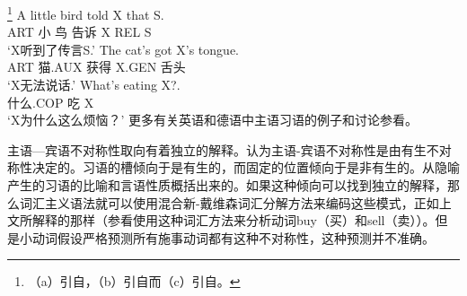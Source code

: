 \footnote{
（a）引自，（b）引自而（c）引自。
}
\eal
\ex\label{bird}
\gll A little bird told X that S.\\
     ART 小 鸟 告诉 X REL S\\
\glt `X听到了传言S.'
\ex\label{cat-tounge}
\gll The cat's got X's tongue.\\
     ART 猫.AUX 获得 X.GEN 舌头\\
\glt `X无法说话.'   
\ex\label{what-is-eating-x}
\gll What's eating X?.\\
     什么.COP 吃 X\\
\glt `X为什么这么烦恼？'
\zl
更多有关英语和德语中主语习语的例子和讨论参看。

主语—宾语不对称性取向有着独立的解释。\citet*{NSW94a}认为主语-宾语不对称性是由有生不对称性决定的。习语的槽倾向于是有生的，而固定的位置倾向于是非有生的。\citet{NSW94a}从隐喻产生的习语的比喻和言语性质概括出来的。如果这种倾向可以找到独立的解释，那么词汇主义语法就可以使用混合新-戴维森词汇分解方法来编码这些模式，正如上文所解释的那样（参看\citet{Wechsler2005a}使用这种词汇方法来分析动词buy（买）和sell（卖））。但是小动词假设严格预测所有施事动词都有这种不对称性，这种预测并不准确。

